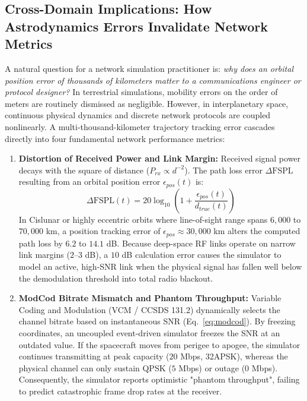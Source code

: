 \documentclass[a4paper,fleqn]{cas-sc}
\begin{document}
\subsection{Cross-Domain Implications: How Astrodynamics Errors Invalidate Network Metrics}
\label{sec:cross_domain_implications}
A natural question for a network simulation practitioner is: \textit{why does an orbital position error of thousands of kilometers matter to a communications engineer or protocol designer?} In terrestrial simulations, mobility errors on the order of meters are routinely dismissed as negligible. However, in interplanetary space, continuous physical dynamics and discrete network protocols are coupled nonlinearly. A multi-thousand-kilometer trajectory tracking error cascades directly into four fundamental network performance metrics:
\begin{enumerate}
    \item \textbf{Distortion of Received Power and Link Margin:} Received signal power decays with the square of distance ($P_{rx} \propto d^{-2}$). The path loss error $\Delta \text{FSPL}$ resulting from an orbital position error $\epsilon_{pos}(t)$ is:
    \begin{equation}
        \Delta \text{FSPL}(t) = 20 \log_{10} \left(1 + \frac{\epsilon_{pos}(t)}{d_{true}(t)}\right)
    \end{equation}
    In Cislunar or highly eccentric orbits where line-of-sight range spans $6,000$ to $70,000$ km, a position tracking error of $\epsilon_{pos} \approx 30,000$ km alters the computed path loss by $6.2$ to $14.1$ dB. Because deep-space RF links operate on narrow link margins ($2$--$3$ dB), a $10$ dB calculation error causes the simulator to model an active, high-SNR link when the physical signal has fallen well below the demodulation threshold into total radio blackout.
    
    \item \textbf{ModCod Bitrate Mismatch and Phantom Throughput:} Variable Coding and Modulation (VCM / CCSDS 131.2) dynamically selects the channel bitrate based on instantaneous SNR (Eq.~\eqref{eq:modcod}). By freezing coordinates, an uncoupled event-driven simulator freezes the SNR at an outdated value. If the spacecraft moves from perigee to apogee, the simulator continues transmitting at peak capacity ($20$ Mbps, 32APSK), whereas the physical channel can only sustain QPSK ($5$ Mbps) or outage ($0$ Mbps). Consequently, the simulator reports optimistic "phantom throughput", failing to predict catastrophic frame drop rates at the receiver.
    

\end{enumerate}
\end{document}
